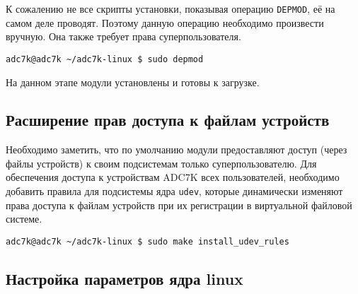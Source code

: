 \documentclass[a4paper]{article}
\begin{document}
К сожалению не все скрипты установки, показывая операцию {\texttt{DEPMOD}}, её на самом деле проводят.
Поэтому данную операцию необходимо произвести вручную. Она также требует права суперпользователя.
\begin{small}\begin{verbatim}
adc7k@adc7k ~/adc7k-linux $ sudo depmod
\end{verbatim}\end{small}

На данном этапе модули установлены и готовы к загрузке.

\subsection{Расширение прав доступа к файлам устройств}

Необходимо заметить, что по умолчанию модули предоставляют
доступ (через файлы устройств) к своим подсистемам только суперпользователю.
Для обеспечения доступа к устройствам ADC7K всех пользователей, необходимо добавить
правила для подсистемы ядра \texttt{udev}, которые динамически изменяют права
доступа к файлам устройств при их регистрации в виртуальной файловой системе.
\begin{small}\begin{verbatim}
adc7k@adc7k ~/adc7k-linux $ sudo make install_udev_rules
\end{verbatim}\end{small}

\subsection{Настройка параметров ядра linux}
\end{document}
